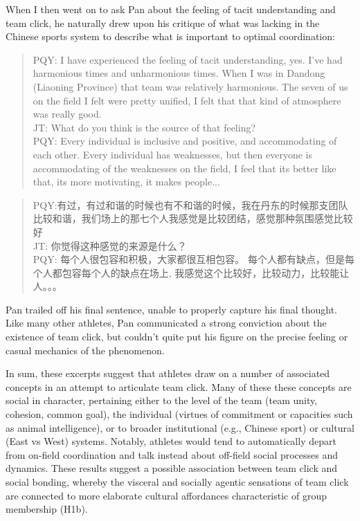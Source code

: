 \begin{CJK}{UTF8}{gbsn}
When I then went on to ask Pan about the feeling of tacit understanding and team click, he naturally drew upon his critique of what was lacking in the Chinese sports system to describe what is important to optimal coordination:

  \begin{quote}
    PQY: I have experienced the feeling of tacit understanding, yes. I've had harmonious times and unharmonious times. When I was in Dandong (Liaoning Province) that team was relatively harmonious.  The seven of us on the field I felt were pretty unified, I felt that that kind of atmosphere was really good. \\

    JT: What do you think is the source of that feeling? \\

    PQY: Every individual is inclusive and positive, and accommodating of each other. Every individual has weaknesses, but then everyone is accommodating of the weaknesses on the field, I feel that its better like that, its more motivating, it makes people...
  \end{quote}

  \begin{quote}
    PQY:有过，有过和谐的时候也有不和谐的时候，我在丹东的时候那支团队比较和谐，我们场上的那七个人我感觉是比较团结，感觉那种氛围感觉比较好 \\
    JT: 你觉得这种感觉的来源是什么？\\
    PQY: 每个人很包容和积极，大家都很互相包容。 每个人都有缺点，但是每个人都包容每个人的缺点在场上, 我感觉这个比较好，比较动力，比较能让人。。。
  \end{quote}

Pan trailed off his final sentence, unable to properly capture his final thought.  Like many other athletes, Pan communicated a strong conviction about the existence of team click, but couldn't quite put his figure on the precise feeling or casual mechanics of the phenomenon.


In sum, these excerpts suggest that athletes draw on a number of associated concepts in an attempt to articulate team click. Many of these these concepts are social in character, pertaining either to the level of the team (team unity, cohesion, common goal), the individual (virtues of commitment or capacities such as animal intelligence), or to broader institutional (e.g., Chinese sport) or cultural (East vs West) systems.  Notably, athletes would tend to automatically depart from on-field coordination and talk instead about off-field social processes and dynamics.  These results suggest a possible association between team click and social bonding, whereby the visceral and socially agentic sensations of team click are connected to more elaborate cultural affordances characteristic of group membership (H1b).


\end{CJK}
